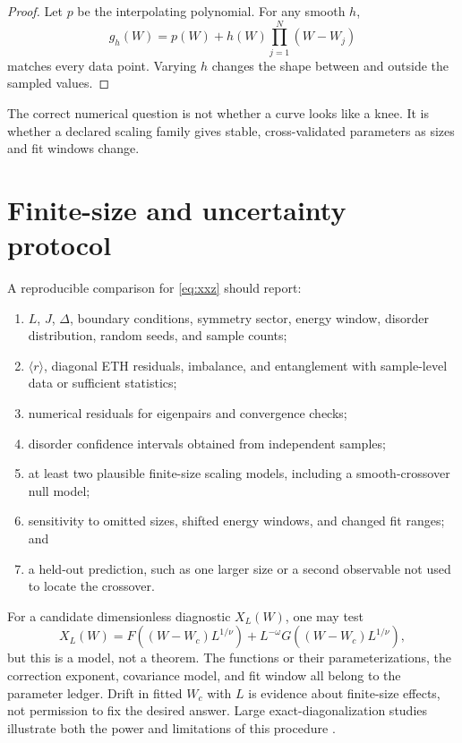 \documentclass[11pt]{article}
\begin{document}
\begin{proof}
Let $p$ be the interpolating polynomial.  For any smooth $h$,
\[
g_h(W)=p(W)+h(W)\prod_{j=1}^{N}(W-W_j)
\]
matches every data point.  Varying $h$ changes the shape between and
outside the sampled values.
\end{proof}

The correct numerical question is not whether a curve looks like a
knee.  It is whether a declared scaling family gives stable,
cross-validated parameters as sizes and fit windows change.

\section{Finite-size and uncertainty protocol}

A reproducible comparison for \cref{eq:xxz} should report:
\begin{enumerate}
\item $L$, $J$, $\Delta$, boundary conditions, symmetry sector, energy
window, disorder distribution, random seeds, and sample counts;
\item $\langle r\rangle$, diagonal ETH residuals, imbalance, and
entanglement with sample-level data or sufficient statistics;
\item numerical residuals for eigenpairs and convergence checks;
\item disorder confidence intervals obtained from independent samples;
\item at least two plausible finite-size scaling models, including a
smooth-crossover null model;
\item sensitivity to omitted sizes, shifted energy windows, and changed
fit ranges; and
\item a held-out prediction, such as one larger size or a second
observable not used to locate the crossover.
\end{enumerate}

For a candidate dimensionless diagnostic $X_L(W)$, one may test
\[
 X_L(W)=F\!\left((W-W_c)L^{1/\nu}\right)
 +L^{-\omega}G\!\left((W-W_c)L^{1/\nu}\right),
\]
but this is a model, not a theorem.  The functions or their
parameterizations, the correction exponent, covariance model, and fit
window all belong to the parameter ledger.  Drift in fitted $W_c$ with
$L$ is evidence about finite-size effects, not permission to fix the
desired answer.  Large exact-diagonalization studies illustrate both the
power and limitations of this procedure \cite{luitz2015}.
\end{document}
